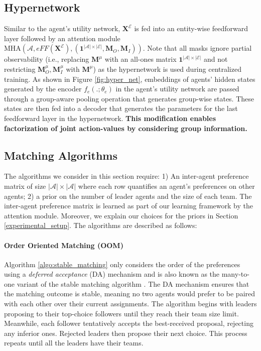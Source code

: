 \documentclass[10pt]{article} %
\begin{document}
\subsection{Hypernetwork} \label{hypernet_section}

Similar to the agent's utility network, $\mathbf{X}^\mathcal{E}$ is fed into an entity-wise feedforward layer followed by an attention module $\text{MHA}(\mathcal{A},\textit{eFF}(\mathbf{X}^\mathcal{E}),(\mathbf{1}^{|\mathcal{A}| \times |\mathcal{E}|},\mathbf{M}_O,\mathbf{M}_I))$. Note that all masks ignore partial observability (i.e., replacing $\mathbf{M}^{\mu}$ with an all-ones matrix $\mathbf{1}^{|\mathcal{A}| \times |\mathcal{E}|}$ and not restricting $\mathbf{M}_{O}^{\mu},\mathbf{M}_{I}^{\mu}$  with $\mathbf{M}^{\mu}$) as the hypernetwork is used during centralized training.
As shown in Figure \ref{fig:hyper_net}, embeddings of agents' hidden states generated by the encoder $f_e(.;\theta_e)$ in the agent's utility network are passed through a group-aware pooling operation that generates group-wise states. These states are then fed into a decoder that generates the parameters for the last feedforward layer in the hypernetwork. \textbf{This modification enables factorization of joint action-values by considering group information.}


\subsection{Matching Algorithms} \label{matching_section}
The algorithms we consider in this section require: 1) An inter-agent preference matrix of size $|\mathcal{A}| \times |\mathcal{A}|$ where each row quantifies an agent's preferences on other agents; 2) a prior on the number of leader agents and the size of each team. The inter-agent preference matrix is learned as part of our learning framework by the attention module. Moreover, we explain our choices for the priors in Section \ref{experimental_setup}. The algorithms are described as follows:

 

\paragraph{Order Oriented Matching (OOM)}

Algorithm \ref{algo:stable_matching} only considers the order of the preferences using a \textit{deferred acceptance} (DA) mechanism and is also known as the many-to-one variant of the stable matching algorithm \citep{gale1962college}. The DA mechanism ensures that the matching outcome is stable, meaning no two agents would prefer to be paired with each other over their current assignments. The algorithm begins with leaders proposing to their top-choice followers until they reach their team size limit. Meanwhile, each follower tentatively accepts the best-received proposal, rejecting any inferior ones. Rejected leaders then propose their next choice. This process repeats until all the leaders have their teams.
\end{document}
